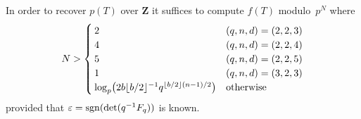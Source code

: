 \begin{thm}
In order to recover $p(T)$ over $\mathbf{Z}$ it suffices to compute 
$f(T)$ modulo~$p^N$ where 
\begin{equation*}
N > \begin{cases}
    2 & (q,n,d) = (2,2,3) \\
    4 & (q,n,d) = (2,2,4) \\
    5 & (q,n,d) = (2,2,5) \\
    1 & (q,n,d) = (3,2,3) \\
    \log_p \bigl( 2 b \lfloor b/2\rfloor^{-1} q^{\left\lfloor b/2\right\rfloor (n - 1) / 2} \bigr) & \text{otherwise}
    \end{cases}
\end{equation*}
provided that $\varepsilon = \operatorname{sgn}(\det(q^{-1} F_q))$ is known.
\end{thm}

